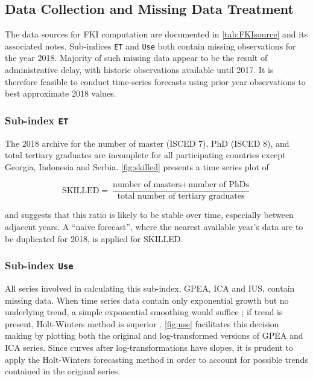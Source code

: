 \documentclass[a4paper,11pt,UKenglish,twoside,openright]{report}\usepackage[]{graphicx}\usepackage[]{color}
\begin{document}
\subsection{Data Collection and Missing Data Treatment}

The data sources for FKI computation are documented in \cref{tab:FKIsource} and its associated notes. Sub-indices \texttt{ET} and \texttt{Use} both contain missing observations for the year 2018. Majority of such missing data appear to be the result of administrative delay, with historic observations available until 2017. It is therefore feasible to conduct time-series forecasts using prior year observations to best approximate 2018 values.



\subsubsection{Sub-index \texttt{ET}}

The 2018 archive for the number of master (ISCED 7), PhD (ISCED 8), and total tertiary graduates are incomplete for all participating countries except Georgia, Indonesia and Serbia. \cref{fig:skilled} presents a time series plot of

\[ \text{SKILLED} = \frac{\text{number of masters} + \text{number of PhDs}}{\text{total number of tertiary graduates}} \]

%
and suggests that this ratio is likely to be stable over time, especially between adjacent years. A ``naive forecast'', where the nearest available year's data are to be duplicated for 2018, is applied for SKILLED.

\subsubsection{Sub-index \texttt{Use}}

All series involved in calculating this sub-index, GPEA, ICA and IUS, contain missing data. When time series data contain only exponential growth but no underlying trend, a simple exponential smoothing would suffice \parencite{garder:1985}; if trend is present, Holt-Winters method is superior \parencite{chatfield:1978}. \cref{fig:use} facilitates this decision making by plotting both the original and log-transformed versions of GPEA and ICA series. Since curves after log-transformations have slopes, it is prudent to apply the Holt-Winters forecasting method in order to account for possible trends contained in the original series.
\end{document}
